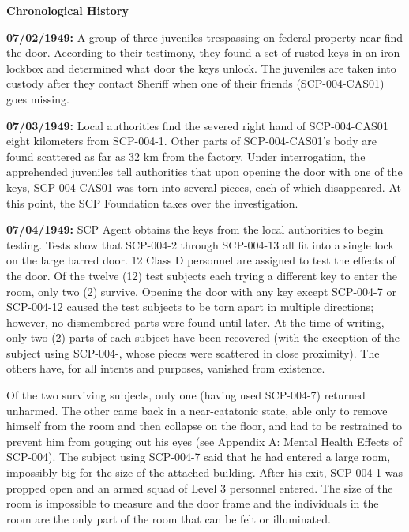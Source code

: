 \begin{flushleft}
\textbf{Chronological History}
\end{flushleft}
\textbf{07/02/1949:} A group of three juveniles trespassing on federal property near  find the door. According to their testimony, they found a set of rusted keys in an iron lockbox and determined what door the keys unlock. The juveniles are taken into custody after they contact Sheriff  when one of their friends (SCP-004-CAS01) goes missing.

\textbf{07/03/1949:} Local authorities find the severed right hand of SCP-004-CAS01 eight kilometers from SCP-004-1. Other parts of SCP-004-CAS01's body are found scattered as far as 32 km from the factory. Under interrogation, the apprehended juveniles tell authorities that upon opening the door with one of the keys, SCP-004-CAS01 was torn into several pieces, each of which disappeared. At this point, the SCP Foundation takes over the investigation.

\textbf{07/04/1949:} SCP Agent  obtains the keys from the local authorities to begin testing. Tests show that SCP-004-2 through SCP-004-13 all fit into a single lock on the large barred door. 12 Class D personnel are assigned to test the effects of the door. Of the twelve (12) test subjects each trying a different key to enter the room, only two (2) survive. Opening the door with any key except SCP-004-7 or SCP-004-12 caused the test subjects to be torn apart in multiple directions; however, no dismembered parts were found until later. At the time of writing, only two (2) parts of each subject have been recovered (with the exception of the subject using SCP-004-, whose pieces were scattered in close proximity). The others have, for all intents and purposes, vanished from existence.

Of the two surviving subjects, only one (having used SCP-004-7) returned unharmed. The other came back in a near-catatonic state, able only to remove himself from the room and then collapse on the floor, and had to be restrained to prevent him from gouging out his eyes (see Appendix A: Mental Health Effects of SCP-004). The subject using SCP-004-7 said that he had entered a large room, impossibly big for the size of the attached building. After his exit, SCP-004-1 was propped open and an armed squad of Level 3 personnel entered. The size of the room is impossible to measure and the door frame and the individuals in the room are the only part of the room that can be felt or illuminated.

